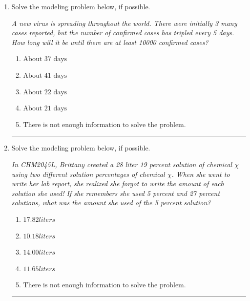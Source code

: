 \documentclass[14pt]{extbook}
\newcommand{\litem}[1]{\item#1\hspace*{-1cm}\rule{\textwidth}{0.4pt}}
\begin{document}
\begin{enumerate}
{\begin{enumerate}[label=\Alph*.]
\end{enumerate} }
\litem{
Solve the modeling problem below, if possible.
\begin{center}
    \textit{ A new virus is spreading throughout the world. There were initially 3 many cases reported, but the number of confirmed cases has tripled every 5 days. How long will it be until there are at least 10000 confirmed cases? }
\end{center}
\begin{enumerate}[label=\Alph*.]
\item \( \text{About } 37 \text{ days} \)
\item \( \text{About } 41 \text{ days} \)
\item \( \text{About } 22 \text{ days} \)
\item \( \text{About } 21 \text{ days} \)
\item \( \text{There is not enough information to solve the problem.} \)

\end{enumerate} }
\litem{
Solve the modeling problem below, if possible.
\begin{center}
    \textit{ In CHM2045L, Brittany created a 28 liter 19 percent solution of chemical $\chi$ using two different solution percentages of chemical $\chi$. When she went to write her lab report, she realized she forgot to write the amount of each solution she used! If she remembers she used 5 percent and 27 percent solutions, what was the amount she used of the 5 percent solution? }
\end{center}
\begin{enumerate}[label=\Alph*.]
\item \( 17.82 liters \)
\item \( 10.18 liters \)
\item \( 14.00 liters \)
\item \( 11.65 liters \)
\item \( \text{There is not enough information to solve the problem.} \)


\end{enumerate}}
\end{enumerate}
\end{document}
